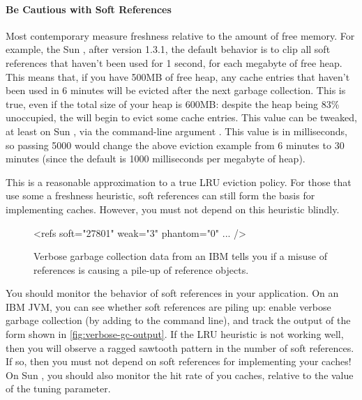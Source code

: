 \paragraph{Be Cautious with Soft References}
Most contemporary \jres measure freshness relative to the amount of free memory.
For example, the Sun \jres, after version 1.3.1, the default behavior is to clip
all soft references that haven't been used for 1 second, for each megabyte of
free heap. This means that, if you have 500MB of free heap, any cache entries
that haven't been used in 6 minutes will be evicted after the next garbage
collection. This is true, even if the total size of your heap is 600MB: despite
the heap being 83\% unoccupied, the \jre will begin to evict some cache entries.
This value can be tweaked, at least on Sun \jres, via the command-line argument
. This value is in milliseconds, so passing
5000 would change the above eviction example from 6 minutes to 30 minutes (since
the default is 1000 milliseconds per megabyte of heap).

This is a reasonable approximation to a true LRU eviction policy. For those
\jres that use some a freshness heuristic, soft references can still form the
basis for implementing caches. However, you must not depend on this heuristic
blindly.





\begin{wrapfigure}[7]{l}{0.395\textwidth}
\centering
\begin{framedlisting}
<refs soft="27801" weak="3" phantom="0" ... />
\end{framedlisting}
\caption{Verbose garbage collection data from an IBM \jre tells you
if a misuse of references is causing a pile-up of reference objects.}
\label{fig:verbose-gc-output}
\end{wrapfigure}
You should monitor the behavior of soft references in your application. On an
IBM JVM, you can see whether soft references are piling up: enable verbose
garbage collection (by adding  to the command
line), and track the output of the form shown
in \autoref{fig:verbose-gc-output}. If the LRU heuristic is not working well,
then you will observe a ragged sawtooth pattern in the number of soft
references. If so, then you must not depend on soft references for implementing
your caches! On Sun \jres, you should also monitor the hit rate of you caches,
relative to the value of the  tuning
parameter.

